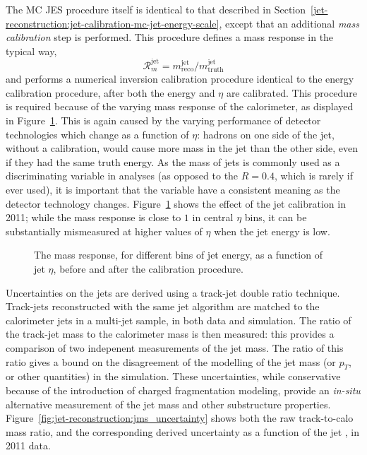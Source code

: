 The MC JES procedure itself is identical to that described in Section~\ref{jet-reconstruction:jet-calibration-mc-jet-energy-scale}, except that an additional \textit{mass calibration} step is performed. This procedure defines a mass response in the typical way,
%
\begin{equation}
\mathcal{R}^{\mathrm{jet}}_m = m^{\mathrm{jet}}_{\mathrm{reco}} /  m^{\mathrm{jet}}_{\mathrm{truth}} 
\end{equation}
%
and performs a numerical inversion calibration procedure identical to the energy calibration procedure, after both the energy and $\eta$ are calibrated. This procedure is required because of the varying mass response of the calorimeter, as displayed in Figure~\ref{fig:jet-reconstruction:total_jms}. This is again caused by the varying performance of detector technologies which change as a function of $\eta$: hadrons on one side of the jet, without a calibration, would cause more mass in the jet than the other side, even if they had the same truth energy. As the mass of \largeR jets is commonly used as a discriminating variable in analyses (as opposed to the $R=0.4$, which is rarely if ever used), it is important that the variable have a consistent meaning as the detector technology changes. Figure~\ref{fig:jet-reconstruction:total_jms} shows the effect of the jet calibration in 2011; while the mass response is close to $1$ in central $\eta$ bins, it can be substantially mismeasured at higher values of $\eta$ when the jet energy is low.

\begin{figure}
\centering
{}
\label{fig:jet-reconstruction:total_jms}
\caption{The mass response, for different bins of jet energy, as a function of jet $\eta$, before and after the calibration procedure.}
\end{figure}

Uncertainties on the \largeR jets are derived using a track-jet double ratio technique. Track-jets reconstructed with the same jet algorithm are matched to the calorimeter jets in a multi-jet sample, in both data and simulation. The ratio of the track-jet mass to the calorimeter mass is then measured: this provides a comparison of two indepenent measurements of the jet mass. The ratio of this ratio gives a bound on the disagreement of the modelling of the jet mass (or $p_T$, or other quantities) in the simulation.  These uncertainties, while conservative because of the introduction of charged fragmentation modeling, provide an \textit{in-situ} alternative measurement of the jet mass and other substructure properties. Figure~\ref{fig:jet-reconstruction:jms_uncertainty} shows both the raw track-to-calo mass ratio, and the corresponding derived uncertainty as a function of the jet \pt, in 2011 data.

